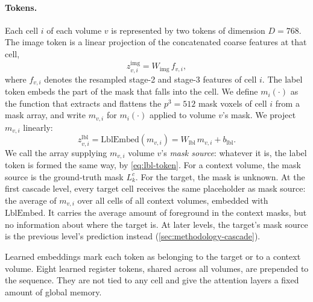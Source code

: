 \paragraph{Tokens.}
Each cell $i$ of each volume $v$ is represented by two tokens of dimension
$D = 768$. The image token is a linear projection of the concatenated coarse
features at that cell,
%
\begin{equation}
  z^{\text{img}}_{v,i} = W_{\text{img}} \, f_{v,i},
  \label{eq:img-token}
\end{equation}
%
where $f_{v,i}$ denotes the resampled stage-2 and stage-3 features of cell $i$.
The label token embeds the part of the mask that falls into the cell. We
define $m_i(\cdot)$ as the function that extracts and flattens the
$p^3 = 512$ mask voxels of cell $i$ from a mask array, and write $m_{v,i}$ for
$m_i(\cdot)$ applied to volume $v$'s mask. We project $m_{v,i}$ linearly:
%
\begin{equation}
  z^{\text{lbl}}_{v,i} = \mathrm{LblEmbed}(m_{v,i}) = W_{\text{lbl}} \, m_{v,i} + b_{\text{lbl}}.
  \label{eq:lbl-token}
\end{equation}
%
We call the array supplying $m_{v,i}$ volume $v$'s \emph{mask source}: whatever
it is, the label token is formed the same way, by \autoref{eq:lbl-token}. For
a context volume, the mask source is the ground-truth mask $L^c_k$. For the
target, the mask is unknown. At the first cascade level, every target cell
receives the same placeholder as mask source: the average of $m_{v,i}$ over
all cells of all context volumes, embedded with $\mathrm{LblEmbed}$. It
carries the average amount of foreground in the context masks, but no
information about where the target is. At later levels, the target's mask
source is the previous level's prediction instead
(\autoref{sec:methodology-cascade}).

Learned embeddings mark each token as belonging to the target or to a context
volume. Eight learned register tokens, shared across all volumes, are
prepended to the sequence. They are not tied to any cell and give the
attention layers a fixed amount of global memory.
